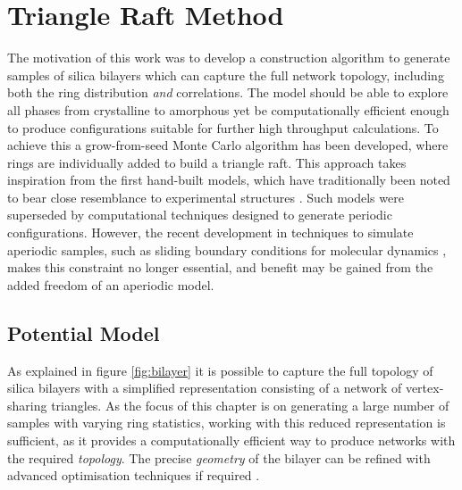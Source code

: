 \section{Triangle Raft Method}
\label{s:triangleraft}

The motivation of this work was to develop a construction algorithm to generate samples of silica bilayers which can capture the full \td{} network topology, including both the ring distribution \textit{and} correlations. 
The model should be able to explore all phases from crystalline to amorphous yet be computationally efficient enough to produce configurations suitable for further high throughput calculations. 
To achieve this a grow-from-seed Monte Carlo algorithm has been developed, where rings are individually added to build a triangle raft.
This approach takes inspiration from the first hand\--built models, which have traditionally been noted to bear close resemblance to experimental structures \cite{Shackelford1982a,Buchner2016a}.
Such models were superseded by computational techniques designed to generate periodic configurations. 
However, the recent development in techniques to simulate aperiodic samples, such as sliding boundary conditions for molecular dynamics \cite{Theran2015}, makes this constraint no longer essential, and benefit may be gained from the added freedom of an aperiodic model.


\subsection{Potential Model}

As explained in figure \ref{fig:bilayer} it is possible to capture the full topology of silica bilayers with a simplified representation consisting of a network of vertex\--sharing \sioiii{} triangles. 
As the focus of this chapter is on generating a large number of samples with varying ring statistics, %
working with this reduced representation is sufficient, as it provides a computationally efficient way to produce networks with the required \textit{topology}. 
The precise \textit{geometry} of the bilayer can be refined with advanced optimisation techniques if required \cite{Tangney2002}. 

